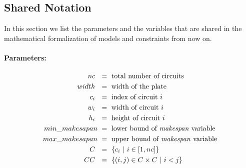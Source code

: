 
\subsection{Shared Notation} \label{sec:shared_variables}
    In this section we list the parameters and the variables that are shared in the mathematical formalization of 
    models and constraints from now on.

    \paragraph{Parameters:}
    \begin{align*}
        nc\             &\ =\ \text{total number of circuits}                   \\
        width\          &\ =\ \text{width of the plate}                         \\
        c_i\            &\ =\ \text{index of circuit  } i                       \\
        w_i\            &\ =\ \text{width of circuit  } i                       \\
        h_i\            &\ =\ \text{height of circuit  } i                      \\
        min\_makesapan  &\ =\ \text{lower bound of \textit{makespan} variable}  \\
        max\_makesapan  &\ =\ \text{upper bound of \textit{makespan} variable}  \\
        C\              &\ =\ \{ c_i\ |\ i \in [1, nc]\}                         \\        
        CC\             &\ =\ \{(i, j) \in C \times C\ |\ i<j \}
    \end{align*}

